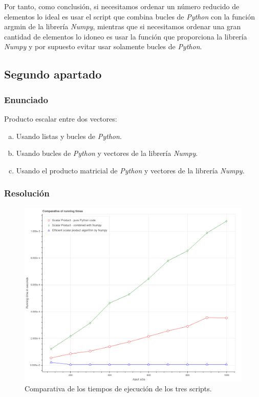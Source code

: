 \documentclass[12pt,twoside]{article}
\begin{document}
Por tanto, como conclusión, si necesitamos ordenar un número reducido de elementos lo ideal es usar el script que combina bucles de \textit{Python} con la función argmin de la librería \textit{Numpy}, mientras que si necesitamos ordenar una gran cantidad de elementos lo idoneo es usar la función que proporciona la librería \textit{Numpy} y por supuesto evitar usar solamente bucles de \textit{Python}.

\subsection{Segundo apartado}

\subsubsection{Enunciado}

\noindent
Producto escalar entre dos vectores:

\begin{enumerate}[(a)]

\item Usando listas y bucles de \textit{Python}.

\item Usando bucles de \textit{Python} y vectores de la librería \textit{Numpy}.

\item Usando el producto matricial de \textit{Python} y vectores de la librería \textit{Numpy}.

\end{enumerate}

\subsubsection{Resolución}

\begin{figure}[hbt]
\begin{center}
	\includegraphics[width=1\textwidth]{21.png}
	\caption{Comparativa de los tiempos de ejecución de los tres scripts.}
	\label{fig:fig2}
\end{center}
\end{figure}
\end{document}
